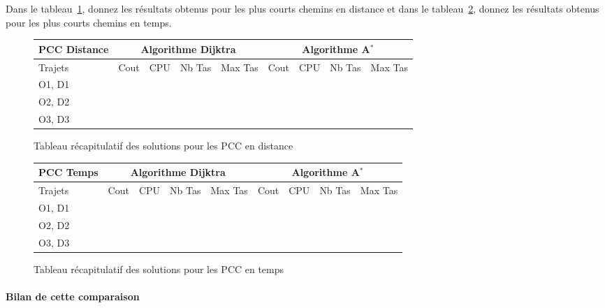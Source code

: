 Dans le tableau~\ref{tab:validation-comparaison-resultats-distance}, donnez les résultats obtenus pour les plus courts chemins en distance et
dans le tableau~\ref{tab:validation-comparaison-resultats-temps}, donnez les résultats obtenus pour les plus courts chemins en temps.
\begin{figure}[!h]
\begin{center}
\begin{tabular}{|l||l|l|l|l||l|l|l|l|}
  \hline
    PCC Distance   & \multicolumn{4}{c||}{Algorithme Dijktra} & \multicolumn{4}{c|}{Algorithme A$^*$}\\
  \hline
	 Trajets & Cout & CPU & Nb Tas & Max Tas & Cout & CPU & Nb Tas & Max Tas \\
  \hline
	O1, D1 & & & & & & & & \\
	\hline
	O2, D2 & & & & & & & & \\
	\hline
	O3, D3 & & & & & & & & \\
	\hline
\end{tabular}
\end{center}
\caption{Tableau récapitulatif des solutions pour les PCC en distance}
\label{tab:validation-comparaison-resultats-distance}
\end{figure}

\begin{figure}[!h]
\begin{center}
\begin{tabular}{|l||l|l|l|l||l|l|l|l|}
  \hline
   PCC Temps & \multicolumn{4}{c||}{Algorithme Dijktra} & \multicolumn{4}{c|}{Algorithme A$^*$}\\
  \hline
	 Trajets & Cout & CPU & Nb Tas & Max Tas & Cout & CPU & Nb Tas & Max Tas \\
  \hline
	O1, D1 & & & & & & & & \\
	\hline
	O2, D2 & & & & & & & & \\
	\hline
	O3, D3 & & & & & & & & \\
	\hline
\end{tabular}
\end{center}
\caption{Tableau récapitulatif des solutions pour les PCC en temps}
\label{tab:validation-comparaison-resultats-temps}
\end{figure}

\paragraph*{Bilan de cette comparaison}

